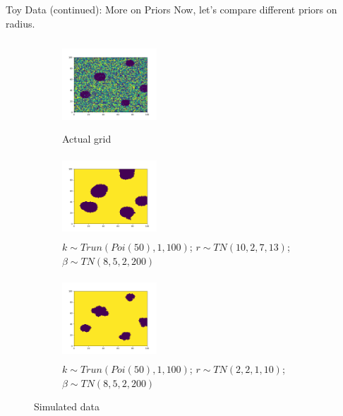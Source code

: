 \documentclass[10pt,mathserif]{beamer}
\begin{document}
\begin{frame}{Toy Data (continued): More on Priors}
Now, let's compare different priors on radius.
\begin{figure}[t!]
    \centering
    \begin{subfigure}[t]{0.3\textwidth}
        \centering
        \includegraphics[height=1.3in, width=1.4in]{../sim_toydata2D_mu8/BDC_gridactual}
        \caption{Actual grid}
    \end{subfigure}%
    \begin{subfigure}[t]{0.3\textwidth}
        \centering
        \includegraphics[height=1.2in, width=1.4in]{../sim_toydata2D_mu8/BDC_grid4}
        \caption{ $k \sim Trun(Poi(50), 1, 100)$; $r \sim TN(10, 2, 7, 13)$; $\beta \sim TN(8, 5, 2, 200)$}
    \end{subfigure}%
        \begin{subfigure}[t]{0.3\textwidth}
        \centering
        \includegraphics[height=1.2in, width=1.4in]{../sim_toydata2D_mu8/BDC_grid5}
        \caption{ $k \sim Trun(Poi(50), 1, 100)$; $r \sim TN(2, 2, 1, 10)$; $\beta \sim TN(8, 5, 2, 200)$}
    \end{subfigure}
    \caption{Simulated data}
\end{figure}
\end{frame}
\end{document}

